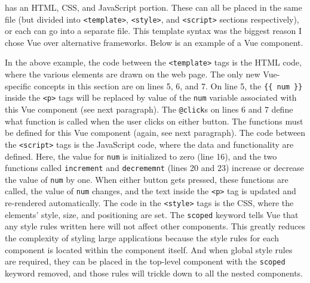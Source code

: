 has an HTML, CSS, and JavaScript portion. These can all be placed in the same file 
(but divided into \texttt{<template>}, \texttt{<style>}, and \texttt{<script>} sections respectively),
or each can go into a separate file. 
This template syntax was the biggest reason I chose Vue over alternative frameworks.
\newline\newline
Below is an example of a Vue component.
%

%
In the above example, the code between the  \texttt{<template>} tags 
is the HTML code, where the various elements are drawn on the web page.
The only new Vue-specific concepts in this section are on lines 5, 6, and 7. 
On line 5, the \texttt{\{\{~num~\}\}} inside the \texttt{<p>} tags will be replaced by 
value of the \texttt{num} variable associated with this Vue component (see next paragraph).
The \texttt{@click}s on lines 6 and 7 define what function is called 
when the user clicks on either button. 
The functions must be defined for this Vue component (again, see next paragraph). 
\newline\newline 
The code between the \texttt{<script>} tags is the JavaScript code,
where the data and functionality are defined. Here, the value for \texttt{num}
is initialized to zero (line 16), and the two functions called 
\texttt{increment} and \texttt{decrememnt} (lines 20 and 23)
increase or decrease the value of \texttt{num} by one. 
When either button gets pressed, these functions are called, 
the value of \texttt{num} changes, 
and the text inside the \texttt{<p>} tag is updated and re-rendered automatically.
\newline\newline
The code in the \texttt{<style>} tags is the CSS, where the 
elements' style, size, and positioning are set. 
The \texttt{scoped} keyword tells Vue that any style rules written here will not affect
other components. This greatly reduces the complexity of styling large applications
because the style rules for each component is located within the component itself. 
And when global style rules are required, they can be placed in the top-level 
component with the \texttt{scoped} keyword removed, and those rules will trickle 
down to all the nested components. 
